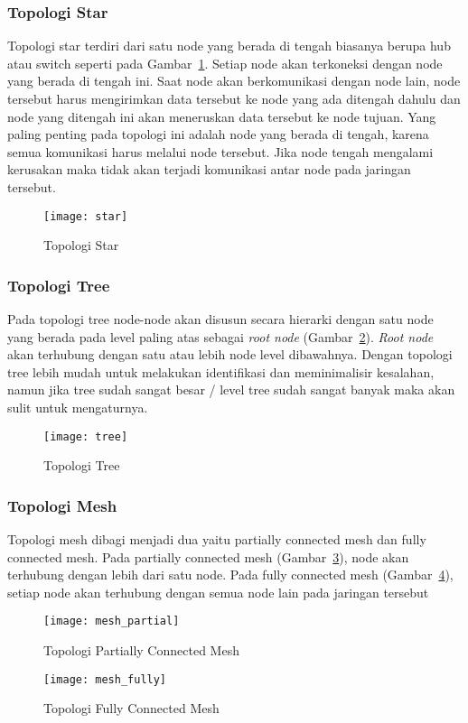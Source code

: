 \subsubsection{Topologi Star}
Topologi star terdiri dari satu node yang berada di tengah biasanya berupa hub atau switch seperti pada Gambar~\ref{fig:star}. Setiap node akan terkoneksi dengan node yang berada di tengah ini. Saat node akan berkomunikasi dengan node lain, node tersebut harus mengirimkan data tersebut ke node yang ada ditengah dahulu dan node yang ditengah ini akan meneruskan data tersebut ke node tujuan. Yang paling penting pada topologi ini adalah node yang berada di tengah, karena semua komunikasi harus melalui node tersebut. Jika node tengah mengalami kerusakan maka tidak akan terjadi komunikasi antar node pada jaringan tersebut.
\begin{figure} [H]
	\centering  
	\texttt{[image: star]}  
	\caption[Topologi Star]{Topologi Star} 
	\label{fig:star} 
\end{figure} 

\subsubsection{Topologi Tree}
Pada topologi tree node-node akan disusun secara hierarki dengan satu node yang berada pada level paling atas sebagai \textit{root node} (Gambar~\ref{fig:tree}). \textit{Root node} akan terhubung dengan satu atau lebih node level dibawahnya. Dengan topologi tree lebih mudah untuk melakukan identifikasi dan meminimalisir kesalahan, namun jika tree sudah sangat besar / level tree sudah sangat banyak maka akan sulit untuk mengaturnya.
\begin{figure} [H]
	\centering  
	\texttt{[image: tree]}  
	\caption[Topologi Tree]{Topologi Tree} 
	\label{fig:tree} 
\end{figure} 

\subsubsection{Topologi Mesh}
Topologi mesh dibagi menjadi dua yaitu partially connected mesh dan fully connected mesh. Pada partially connected mesh (Gambar~\ref{fig:mesh_partial}), node akan terhubung dengan lebih dari satu node. Pada fully connected mesh (Gambar~\ref{fig:mesh_fully}), setiap node akan terhubung dengan semua node lain pada jaringan tersebut
\begin{figure} [H]
	\centering  
	\texttt{[image: mesh\_partial]}  
	\caption[Topologi Partially Connected Mesh]{Topologi Partially Connected Mesh} 
	\label{fig:mesh_partial} 
\end{figure} 
\begin{figure} [H]
	\centering  
	\texttt{[image: mesh\_fully]}  
	\caption[Topologi Fully Connected Mesh]{Topologi Fully Connected Mesh} 
	\label{fig:mesh_fully} 
\end{figure} 

